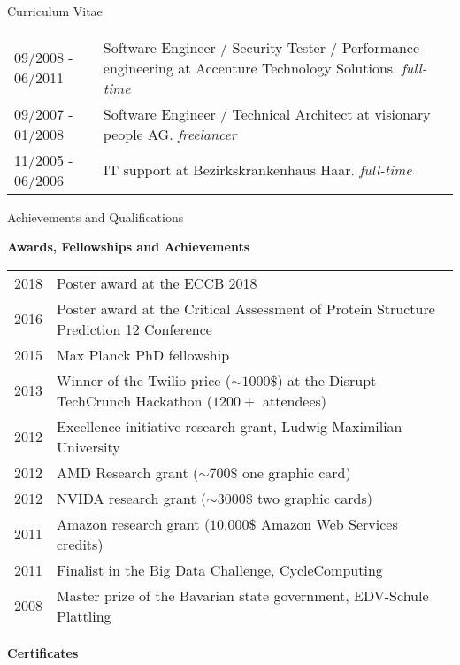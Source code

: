 \documentclass{resume} %
\begin{document}
\begin{rSection}{Curriculum Vitae}
\begin{tabular}{p{3.6cm}p{13.0cm}}
\\[1.mm]
09/2008 - 06/2011 & Software Engineer / Security Tester / Performance engineering at Accenture Technology Solutions. \textit{full-time}
\\[1.mm]
09/2007 - 01/2008 & Software Engineer / Technical Architect at visionary people AG. \textit{freelancer}
\\[1.mm]
11/2005 - 06/2006 & IT support at Bezirkskrankenhaus Haar. \textit{full-time}
\\[1.mm]
\end{tabular}
\vspace{1mm}
\end{rSection}


\newpage

\begin{rSection}{Achievements and Qualifications}
\vspace{2mm}

{\bf Awards, Fellowships and Achievements}\vspace{1mm}

\begin{tabular}{p{2.5cm}p{14.1cm}}
2018 & Poster award at the ECCB 2018
\\[1.mm] 
2016 & Poster award at the Critical Assessment of Protein Structure Prediction 12 Conference   
\\[1.mm] 
2015 & Max Planck PhD fellowship
\\[1.mm] 
2013 & Winner of the Twilio price (${\sim}1000\$$) at the Disrupt TechCrunch Hackathon ($1200{+}$ attendees)
\\[1.mm] 
2012 & Excellence initiative research grant, Ludwig Maximilian University
\\[1.mm] 
2012 & AMD Research grant (${\sim}700$\$ one graphic card)
\\[1.mm] 
2012 & NVIDA research grant (${\sim}3000$\$ two graphic cards)
\\[1.mm] 
2011 & Amazon research grant ($10.000\$$ Amazon Web Services credits)
\\[1.mm] 
2011 & Finalist in the Big Data Challenge, CycleComputing
\\[1.mm] 
2008 & Master prize of the Bavarian state government, EDV-Schule Plattling
\\[1.mm] 
\end{tabular}
\vspace{1.0mm}

{\bf Certificates }\vspace{1mm}


\end{rSection}
\end{document}
